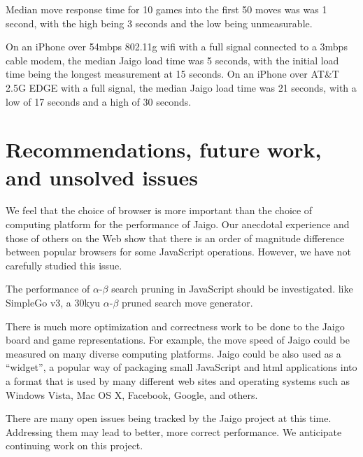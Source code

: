 \documentclass{memoir}
\begin{document}
Median move response time for 10 games into the first 50 moves was was 1 second, with the high being 3 seconds and the low being unmeasurable.

On an iPhone over 54mbps 802.11g wifi with a full signal connected to a 3mbps cable modem, the median Jaigo load time was 5 seconds, with the initial load time being the longest measurement at 15 seconds. On an iPhone over AT\&T 2.5G EDGE with a full signal, the median Jaigo load time was 21 seconds, with a low of 17 seconds and a high of 30 seconds.

\chapter{Recommendations, future work, and unsolved issues}
We feel that the choice of browser is more important than the choice of computing platform for the performance of Jaigo. Our anecdotal experience and those of others on the Web show that there is an order of magnitude difference between popular browsers for some JavaScript operations. However, we have not carefully studied this issue.%

The performance of $\alpha$-$\beta$ search pruning in JavaScript should be investigated. like SimpleGo v3, a 30kyu $\alpha$-$\beta$ pruned search move generator.

There is much more optimization and correctness work to be done to the Jaigo board and game representations. For example, the move speed of Jaigo could be measured on many diverse computing platforms. Jaigo could be also used as a ``widget'', a popular way of packaging small JavaScript and html applications into a format that is used by many different web sites and operating systems such as Windows Vista, Mac OS X, Facebook, Google, and others.

There are many open issues being tracked by the Jaigo project at this time. Addressing them may lead to better, more correct performance. We anticipate continuing work on this project.

\backmatter


\end{document}
